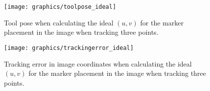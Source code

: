 \begin{figure}[H]
\centering
\texttt{[image: graphics/toolpose\_ideal]}
\caption{Tool pose when calculating the ideal $(u,v)$ for the marker placement in the image when tracking three points.}
\label{fig:toolpose_ideal_3p}
\end{figure}


\begin{figure}[H]
\centering
\texttt{[image: graphics/trackingerror\_ideal]}
\caption{Tracking error in image coordinates when calculating the ideal $(u,v)$ for the marker placement in the image when tracking three points.}
\label{fig:trackingerror_ideal_3p}
\end{figure}

